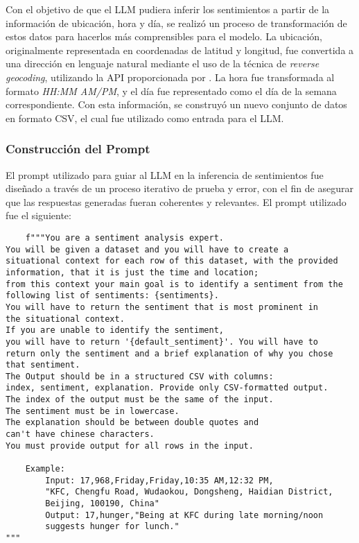 Con el objetivo de que el LLM pudiera inferir los sentimientos a partir de la 
información de ubicación, hora y día, se realizó un proceso de transformación 
de estos datos para hacerlos más comprensibles para el modelo. La ubicación, 
originalmente representada en coordenadas de latitud y longitud, fue 
convertida a una dirección en lenguaje natural mediante el uso de la 
técnica de \textit{reverse geocoding}, utilizando la API proporcionada 
por \cite{geocode_maps_co}. La hora fue transformada al 
formato \textit{HH:MM AM/PM}, y el día fue representado como el día de 
la semana correspondiente. Con esta información, se construyó un nuevo 
conjunto de datos en formato CSV, el cual fue utilizado como entrada para el LLM.

\subsubsection{Construcción del Prompt}

El prompt utilizado para guiar al LLM en la inferencia de sentimientos 
fue diseñado a través de un proceso iterativo de prueba y error, con el 
fin de asegurar que las respuestas generadas fueran coherentes y relevantes. 
El prompt utilizado fue el siguiente:
\begin{verbatim}
    f"""You are a sentiment analysis expert.
You will be given a dataset and you will have to create a
situational context for each row of this dataset, with the provided 
information, that it is just the time and location;
from this context your main goal is to identify a sentiment from the 
following list of sentiments: {sentiments}.
You will have to return the sentiment that is most prominent in 
the situational context.
If you are unable to identify the sentiment,
you will have to return '{default_sentiment}'. You will have to 
return only the sentiment and a brief explanation of why you chose 
that sentiment.
The Output should be in a structured CSV with columns: 
index, sentiment, explanation. Provide only CSV-formatted output.
The index of the output must be the same of the input. 
The sentiment must be in lowercase.
The explanation should be between double quotes and 
can't have chinese characters.
You must provide output for all rows in the input.

    Example:
        Input: 17,968,Friday,Friday,10:35 AM,12:32 PM,
        "KFC, Chengfu Road, Wudaokou, Dongsheng, Haidian District, 
        Beijing, 100190, China"
        Output: 17,hunger,"Being at KFC during late morning/noon 
        suggests hunger for lunch."
"""
\end{verbatim}

